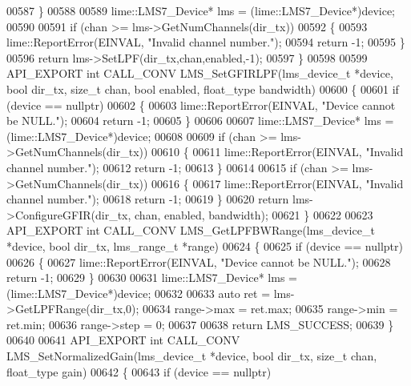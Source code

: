 \begin{DoxyCode}
00587     \}
00588 
00589     lime::LMS7_Device* lms = (lime::LMS7_Device*)device;
00590 
00591     \textcolor{keywordflow}{if} (chan >= lms->GetNumChannels(dir\_tx))
00592     \{
00593         lime::ReportError(EINVAL, \textcolor{stringliteral}{"Invalid channel number."});
00594         \textcolor{keywordflow}{return} -1;
00595     \}
00596     \textcolor{keywordflow}{return} lms->SetLPF(dir\_tx,chan,enabled,-1);
00597 \}
00598 
00599 API_EXPORT \textcolor{keywordtype}{int} CALL_CONV LMS_SetGFIRLPF(lms_device_t *device, \textcolor{keywordtype}{bool} dir_tx, \textcolor{keywordtype}{size\_t} 
      chan, \textcolor{keywordtype}{bool} enabled, float_type bandwidth)
00600 \{
00601     \textcolor{keywordflow}{if} (device == \textcolor{keyword}{nullptr})
00602     \{
00603         lime::ReportError(EINVAL, \textcolor{stringliteral}{"Device cannot be NULL."});
00604         \textcolor{keywordflow}{return} -1;
00605     \}
00606 
00607     lime::LMS7_Device* lms = (lime::LMS7_Device*)device;
00608 
00609     \textcolor{keywordflow}{if} (chan >= lms->GetNumChannels(dir\_tx))
00610     \{
00611         lime::ReportError(EINVAL, \textcolor{stringliteral}{"Invalid channel number."});
00612         \textcolor{keywordflow}{return} -1;
00613     \}
00614 
00615     \textcolor{keywordflow}{if} (chan >= lms->GetNumChannels(dir\_tx))
00616     \{
00617         lime::ReportError(EINVAL, \textcolor{stringliteral}{"Invalid channel number."});
00618         \textcolor{keywordflow}{return} -1;
00619     \}
00620     \textcolor{keywordflow}{return} lms->ConfigureGFIR(dir\_tx, chan, enabled, bandwidth);
00621 \}
00622 
00623 API_EXPORT \textcolor{keywordtype}{int} CALL_CONV LMS_GetLPFBWRange(lms_device_t *device, \textcolor{keywordtype}{bool} dir_tx, 
      lms_range_t *range)
00624 \{
00625     \textcolor{keywordflow}{if} (device == \textcolor{keyword}{nullptr})
00626     \{
00627         lime::ReportError(EINVAL, \textcolor{stringliteral}{"Device cannot be NULL."});
00628         \textcolor{keywordflow}{return} -1;
00629     \}
00630 
00631     lime::LMS7_Device* lms = (lime::LMS7_Device*)device;
00632 
00633     \textcolor{keyword}{auto} ret = lms->GetLPFRange(dir\_tx,0);
00634     range->max = ret.max;
00635     range->min = ret.min;
00636     range->step = 0;
00637 
00638     \textcolor{keywordflow}{return} LMS_SUCCESS;
00639 \}
00640 
00641 API_EXPORT \textcolor{keywordtype}{int} CALL_CONV LMS_SetNormalizedGain(lms_device_t *device, \textcolor{keywordtype}{bool} dir_tx, \textcolor{keywordtype}{size\_t} 
      chan, float_type gain)
00642 \{
00643     \textcolor{keywordflow}{if} (device == \textcolor{keyword}{nullptr})

\end{DoxyCode}
